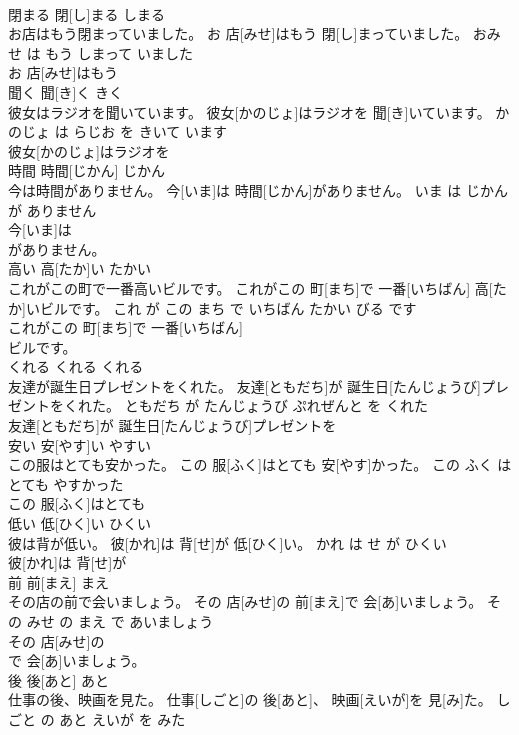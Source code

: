 \documentclass[8pt]{extreport}
\begin{document}
\begin{CJK}{UTF8}{min}
\\	閉まる	閉[し]まる	しまる	
\\	お店はもう閉まっていました。	お 店[みせ]はもう 閉[し]まっていました。	おみせ は もう しまって いました	
\\	お 店[みせ]はもう
\\	聞く	聞[き]く	きく	
\\	彼女はラジオを聞いています。	彼女[かのじょ]はラジオを 聞[き]いています。	かのじょ は らじお を きいて います	
\\	彼女[かのじょ]はラジオを
\\	時間	時間[じかん]	じかん	
\\	今は時間がありません。	今[いま]は 時間[じかん]がありません。	いま は じかん が ありません	
\\	今[いま]は
\\	がありません。			
\\	高い	高[たか]い	たかい	
\\	これがこの町で一番高いビルです。	これがこの 町[まち]で 一番[いちばん] 高[たか]いビルです。	これ が この まち で いちばん たかい びる です	
\\	これがこの 町[まち]で 一番[いちばん]
\\	ビルです。			
\\	くれる	くれる	くれる	
\\	友達が誕生日プレゼントをくれた。	友達[ともだち]が 誕生日[たんじょうび]プレゼントをくれた。	ともだち が たんじょうび ぷれぜんと を くれた	
\\	友達[ともだち]が 誕生日[たんじょうび]プレゼントを
\\	安い	安[やす]い	やすい	
\\	この服はとても安かった。	この 服[ふく]はとても 安[やす]かった。	この ふく は とても やすかった	
\\	この 服[ふく]はとても
\\	低い	低[ひく]い	ひくい	
\\	彼は背が低い。	彼[かれ]は 背[せ]が 低[ひく]い。	かれ は せ が ひくい	
\\	彼[かれ]は 背[せ]が
\\	前	前[まえ]	まえ	
\\	その店の前で会いましょう。	その 店[みせ]の 前[まえ]で 会[あ]いましょう。	その みせ の まえ で あいましょう	
\\	その 店[みせ]の
\\	で 会[あ]いましょう。			
\\	後	後[あと]	あと	
\\	仕事の後、映画を見た。	仕事[しごと]の 後[あと]、 映画[えいが]を 見[み]た。	しごと の あと えいが を みた	

\end{CJK}
\end{document}
